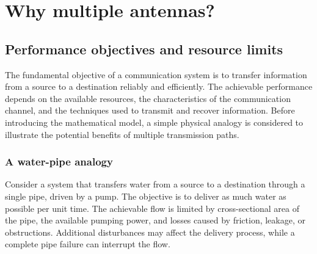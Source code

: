 
\section{Why multiple antennas?}


\subsection{Performance objectives and resource limits}
\label{sec:performance_objectives}

The fundamental objective of a communication system is to transfer
information from a source to a destination reliably and efficiently.
The achievable performance depends on the available resources, the
characteristics of the communication channel, and the techniques
used to transmit and recover information. Before introducing the
mathematical model,  a simple physical analogy is considered to
illustrate the potential benefits of multiple transmission paths.

\subsubsection*{A water-pipe analogy}

Consider a system that transfers water from a source to a destination
through a single pipe, driven by a pump. The objective is to deliver
as much water as possible per unit time. The achievable flow is
limited by  cross-sectional area of the pipe, the available pumping
power, and losses caused by friction, leakage, or obstructions.
Additional disturbances may affect the delivery process, while
a complete pipe failure can interrupt the flow.

